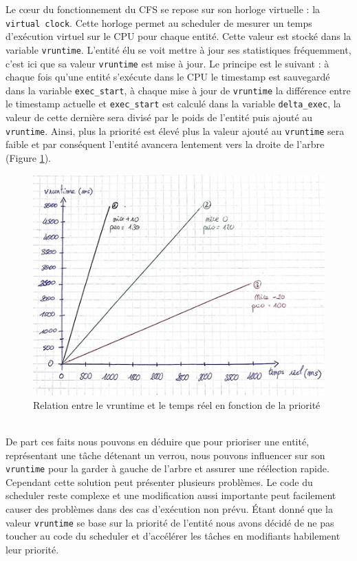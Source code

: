 Le cœur du fonctionnement du CFS se repose sur son horloge virtuelle : la \verb|virtual clock|. Cette horloge permet au scheduler de mesurer un temps d'exécution virtuel sur le CPU pour chaque entité. Cette valeur est stocké dans la variable \verb|vruntime|. L'entité élu se voit mettre à jour ses statistiques fréquemment, c'est ici que sa valeur \verb|vruntime| est mise à jour. Le principe est le suivant : à chaque fois qu'une entité s'exécute dans le CPU le timestamp est sauvegardé dans la variable \verb|exec_start|, à chaque mise à jour de \verb|vruntime| la différence entre le timestamp actuelle et \verb|exec_start| est calculé dans la variable \verb|delta_exec|, la valeur de cette dernière sera divisé par le poids de l'entité puis ajouté au \verb|vruntime|. Ainsi, plus la priorité est élevé plus la valeur ajouté au \verb|vruntime| sera faible et par conséquent l'entité avancera lentement vers la droite de l'arbre (Figure \ref{fig:sched}).
\\

\begin{figure}[h!]
	\centering
	\includegraphics[scale=0.6]{schema_sched.jpg}
	\caption{Relation entre le vruntime et le temps réel en fonction de la priorité}
	\label{fig:sched}
\end{figure}
\\

De part ces faits nous pouvons en déduire que pour prioriser une entité, représentant une tâche détenant un verrou, nous pouvons influencer sur son \verb|vruntime| pour la garder à gauche de l'arbre et assurer une réélection rapide. Cependant cette solution peut présenter plusieurs problèmes. Le code du scheduler reste complexe et une modification aussi importante peut facilement causer des problèmes dans des cas d'exécution non prévu. Étant donné que la valeur \verb|vruntime| se base sur la priorité de l'entité nous avons décidé de ne pas toucher au code du scheduler et d'accélérer les tâches en modifiants habilement leur priorité.









